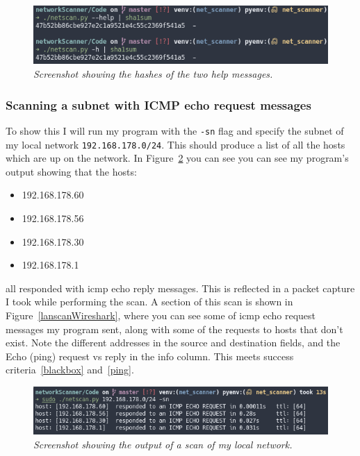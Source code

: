 \documentclass[titlepage]{article}
\let\Oldsubsubsection\subsubsection{}
\renewcommand{\subsubsection}{\FloatBarrier\Oldsubsubsection}
\begin{document}
\begin{figure}[H]
  \centering
  \includegraphics[width=\textwidth]{messagehashes.png}
  \caption{\textit{%
    Screenshot showing the hashes of the two help messages.
}}\label{messagehash}
\end{figure}

\subsubsection{Scanning a subnet with ICMP echo request messages}\label{test:pingscan}
To show this I will run my program with the \verb|-sn| flag and specify the
subnet of my local network \verb|192.168.178.0/24|.
This should produce a list of all the hosts which are up on the network.
In Figure~\ref{lanscantest} you can see you can see my program's output
showing that the hosts:
\begin{itemize}
  \item{192.168.178.60}
  \item{192.168.178.56}
  \item{192.168.178.30}
  \item{192.168.178.1}
\end{itemize}
all responded with \gls{icmp} echo reply messages.
This is reflected in a packet capture I took while performing the scan.
A section of this scan is shown in Figure~\ref{lanscanWireshark},
where you can see some of \gls{icmp} echo request messages my program sent,
along with some of the requests to hosts that don't exist.
Note the different addresses in the source and destination fields,
and the Echo (ping) request vs reply in the info column.
This meets success criteria~\ref{blackbox} and~\ref{ping}.

\begin{figure}[H]
  \centering
  \includegraphics[width=\textwidth]{pingscantest.png}
  \caption{\textit{%
    Screenshot showing the output of a scan of my local network.
}}\label{lanscantest}
\end{figure}
\end{document}
